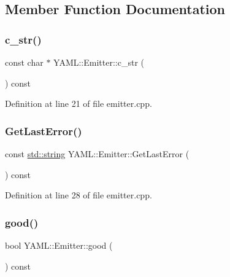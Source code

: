 \subsection{Member Function Documentation}
\mbox{\label{class_y_a_m_l_1_1_emitter_a0b965b7db9006956e8448aaac8db2b13}} 
\subsubsection{\texorpdfstring{c\_str()}{c\_str()}}
{\footnotesize\ttfamily const char $\ast$ Y\+A\+M\+L\+::\+Emitter\+::c\+\_\+str (\begin{DoxyParamCaption}{ }\end{DoxyParamCaption}) const}



Definition at line 21 of file emitter.\+cpp.

\mbox{\label{class_y_a_m_l_1_1_emitter_a79ccd566493396d0312bfc8ca45397ca}} 
\subsubsection{\texorpdfstring{GetLastError()}{GetLastError()}}
{\footnotesize\ttfamily const \mbox{\hyperlink{glad_8h_ac83513893df92266f79a515488701770}{std\+::string}} Y\+A\+M\+L\+::\+Emitter\+::\+Get\+Last\+Error (\begin{DoxyParamCaption}{ }\end{DoxyParamCaption}) const}



Definition at line 28 of file emitter.\+cpp.

\mbox{\label{class_y_a_m_l_1_1_emitter_a3a0c449843c5fda5d1e6faae188debcb}} 
\subsubsection{\texorpdfstring{good()}{good()}}
{\footnotesize\ttfamily bool Y\+A\+M\+L\+::\+Emitter\+::good (\begin{DoxyParamCaption}{ }\end{DoxyParamCaption}) const}



